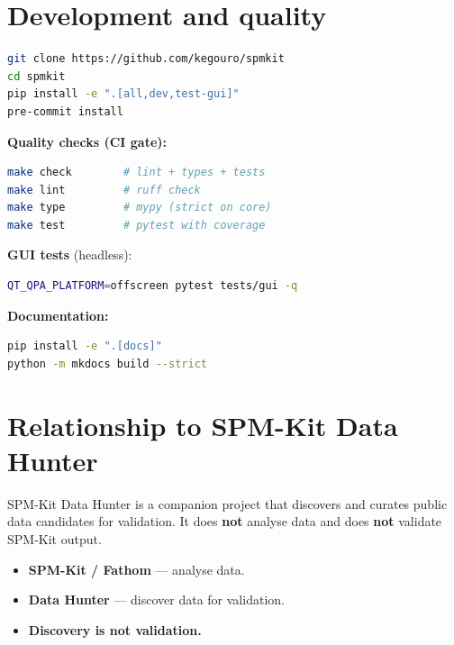 \documentclass[a4paper,11pt]{article}
\begin{document}
\section{Development and quality}

\begin{lstlisting}[language=bash]
git clone https://github.com/kegouro/spmkit
cd spmkit
pip install -e ".[all,dev,test-gui]"
pre-commit install
\end{lstlisting}

\textbf{Quality checks (CI gate):}
\begin{lstlisting}[language=bash]
make check        # lint + types + tests
make lint         # ruff check
make type         # mypy (strict on core)
make test         # pytest with coverage
\end{lstlisting}

\textbf{GUI tests} (headless):
\begin{lstlisting}[language=bash]
QT_QPA_PLATFORM=offscreen pytest tests/gui -q
\end{lstlisting}

\textbf{Documentation:}
\begin{lstlisting}[language=bash]
pip install -e ".[docs]"
python -m mkdocs build --strict
\end{lstlisting}

\section{Relationship to SPM-Kit Data Hunter}

SPM-Kit Data Hunter is a companion project that discovers and curates public data
candidates for validation. It does \textbf{not} analyse data and does \textbf{not}
validate SPM-Kit output.

\begin{itemize}[nosep]
  \item \textbf{SPM-Kit / Fathom} --- analyse data.
  \item \textbf{Data Hunter} --- discover data for validation.
  \item \textbf{Discovery is not validation.}
\end{itemize}

\end{document}
